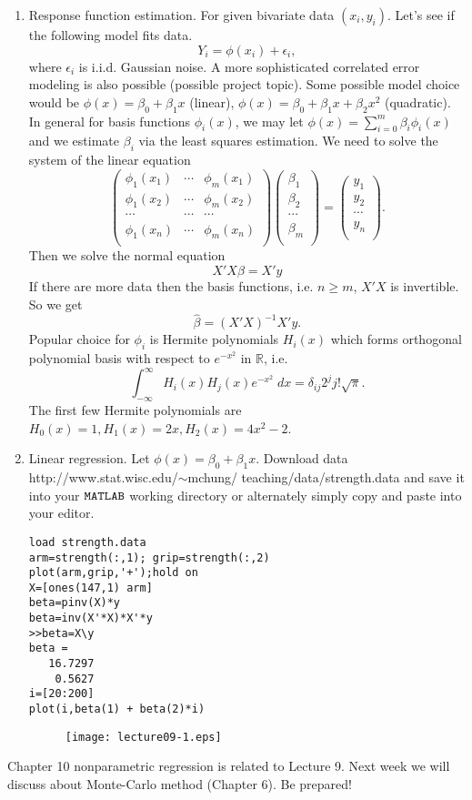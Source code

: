\documentclass[11pt,twocolumn]{article} %
\begin{document}
\begin{enumerate}
\item Response function estimation. For given bivariate data
$(x_i,y_i)$. Let's see if the following model fits data.
$$Y_i=\phi(x_i) + \epsilon_i,$$
where $\epsilon_i$ is i.i.d. Gaussian noise. A more sophisticated
correlated error modeling is also possible (possible project
topic). Some possible model choice would be $\phi(x) = \beta_0 +
\beta_1 x$ (linear), $\phi(x) = \beta_0 + \beta_1 x + \beta_2 x^2$
(quadratic). In general for basis functions $\phi_i(x)$, we may let
$\phi(x) = \sum_{i=0}^m \beta_i \phi_i(x)$ and we estimate
$\beta_i$ via the least squares estimation. We need to solve the
system of the linear equation
$$ \left(%
\begin{array}{ccc}
  \phi_1(x_1)  &\cdots & \phi_m(x_1) \\
\phi_1(x_2)  &\cdots & \phi_m(x_2) \\
\cdots  & \cdots & \cdots\\
\phi_1(x_n)  &\cdots & \phi_m(x_n) \\
\end{array}\right)
\left(
\begin{array}{c}
  \beta_1 \\
  \beta_2\\
  \cdots\\
  \beta_m\\
\end{array}%
\right) = \left(%
\begin{array}{c}
  y_1 \\
  y_2\\
  \cdots\\
  y_n \\
\end{array}%
\right).$$ Then we solve the normal equation
$$X'X\beta = X'y$$
If there are more data then the basis functions, i.e. $n \geq m$,
$X'X$ is invertible. So we get
$$\hat \beta = (X'X)^{-1}X'y.$$
Popular choice for $\phi_i$ is Hermite polynomials $H_i(x)$ which
forms orthogonal polynomial basis with respect to $e^{-x^2}$ in
$\mathbb{R}$, i.e.
$$\int_{-\infty}^{\infty} H_i(x)H_j(x) e^{-x^2} \; dx =\delta_{ij}2^jj!\sqrt{\pi}.$$
The first few Hermite polynomials are $H_0(x)=1, H_1(x)=2x,
H_2(x)=4x^2-2$.

 \item Linear regression. Let $\phi(x)=\beta_0+\beta_1 x$.
Download data
http://www.stat.wisc.edu/$\sim$mchung/
teaching/data/strength.data
and save it into your $\tt{MATLAB}$ working directory or alternately
simply copy and paste into your editor.
\begin{verbatim}
load strength.data
arm=strength(:,1); grip=strength(:,2)
plot(arm,grip,'+');hold on
X=[ones(147,1) arm]
beta=pinv(X)*y
beta=inv(X'*X)*X'*y
>>beta=X\y
beta =
   16.7297
    0.5627
i=[20:200]
plot(i,beta(1) + beta(2)*i)
\end{verbatim}
\begin{figure}
\centering
\renewcommand{\baselinestretch}{1}
\texttt{[image: lecture09-1.eps]}
\end{figure}
\end{enumerate}
\small
Chapter 10 nonparametric regression is related to Lecture 9. Next week we will discuss about Monte-Carlo method (Chapter 6). Be prepared!
\end{document}
